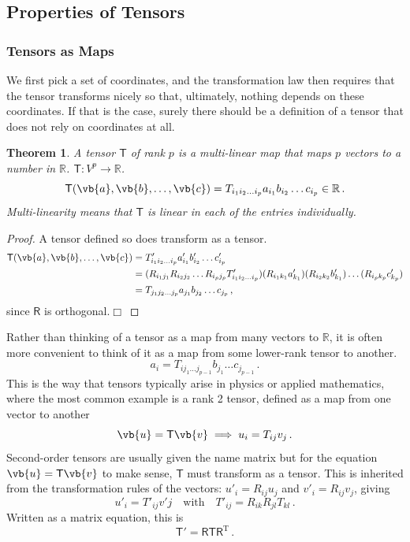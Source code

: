 \documentclass{article}
\theoremstyle{plain}\theoremheaderfont{\normalfont\itshape}\theorembodyfont{\rmfamily}\theoremseparator{.}\newtheorem*{rem}{Remark}\newtheorem*{ex}{Example}\newtheorem*{proof}{Proof}\newtheorem*{altp}{Alternative proof}
\theoremstyle{plain}\theoremheaderfont{\normalfont\bfseries}\theorembodyfont{\rmfamily}\theoremseparator{.}\newtheorem{thm}{Theorem}[section]\newtheorem{lem}[thm]{Lemma}\newtheorem{prop}[thm]{Proposition}\newtheorem*{cor}{Corollary}\newtheorem{defn}[thm]{Definition}\newtheorem{clm}[thm]{Claim}\newtheorem{clminproof}{Claim}
\theoremstyle{break}\theoremheaderfont{\normalfont\itshape}\theorembodyfont{\rmfamily}\theoremseparator{.\medskip}\newtheorem*{proofskip}{Proof}\newtheorem*{exs}{Examples}\newtheorem*{rems}{Remarks}
\theoremstyle{break}\theoremheaderfont{\normalfont\bfseries}\theorembodyfont{\rmfamily}\theoremseparator{.\medskip}\newtheorem{lemskip}[thm]{Lemma}\newtheorem{defnskip}[thm]{Definition}\newtheorem{propskip}[thm]{Proposition}\newtheorem{thmskip}[thm]{Theorem}
\numberwithin{equation}{section}
\newcommand{\qed}{\hfill\ensuremath{\Box}}
\newcommand{\tp}{^\mathrm{T}}
\begin{document}
	\subsection{Properties of Tensors}
	\subsubsection{Tensors as Maps}
	We first pick a set of coordinates, and the transformation law then requires that the tensor transforms nicely so that, ultimately, nothing depends on these coordinates. If that is the case, surely there should be a definition of a tensor that does not rely on coordinates at all.
	\begin{thm}
		A tensor \(\mathsf{T}\) of rank \(p\) is a multi-linear map that maps \(p\) vectors to a number in \(\mathbb{R}\). \(\mathsf{T}:V^p\to\mathbb{R}\).
		\[\mathsf{T}(\vb{a},\vb{b},\dots,\vb{c})=T_{i_1i_2\dots i_p}a_{i_1}b_{i_2}\dots c_{i_p}\in\mathbb{R}\,.\]
		Multi-linearity means that \(\mathsf{T}\) is linear in each of the entries individually.
	\end{thm}
	\begin{proof}
		A tensor defined so does transform as a tensor.
		\begin{align*}
			\mathsf{T}(\vb{a},\vb{b},\dots,\vb{c})&=T'_{i_1i_2\dots i_p}a'_{i_1}b'_{i_2}\dots c'_{i_p}\\
			&=(R_{i_1j_1}R_{i_2j_2}\dots R_{i_pj_p}T'_{i_1i_2\dots i_p})(R_{i_1k_1}a'_{k_1})(R_{i_2k_2}b'_{k_1})\dots (R_{i_pk_p}c'_{k_p})\\
			&=T_{j_1j_2\dots j_p}a_{j_1}b_{j_2}\dots c_{j_p}\,,
		\end{align*}
		since \(\mathsf{R}\) is orthogonal.\qed
	\end{proof}
	Rather than thinking of a tensor as a map from many vectors to \(\mathbb{R}\), it is often more convenient to think of it as a map from some lower-rank tensor to another.
	\[a_i=T_{ij_1\dots j_{p-1}}b_{j_1}\dots c_{j_{p-1}}\,.\]
	This is the way that tensors typically arise in physics or applied mathematics, where the most common example is a rank 2 tensor, defined as a map from one vector to another
	\[\vb{u}=\mathsf{T}\vb{v}\implies u_i=T_{ij}v_j\,.\]
	Second-order tensors are usually given the name matrix but for the equation \(\vb{u}=\mathsf{T}\vb{v}\) to make sense, \(\mathsf{T}\) must transform as a tensor. This is inherited from the transformation rules of the vectors: \(u'_i= R_{ij}u_j\) and \(v'_i=R_{ij}v_{j}\), giving
	\[u'_i=T'_{ij}v'j\quad\text{with}\quad T'_{ij}=R_{ik}R_{jl}T_{kl}\,.\]
	Written as a matrix equation, this is
	\[\mathsf{T}'=\mathsf{RTR}\tp\,.\]
\end{document}
